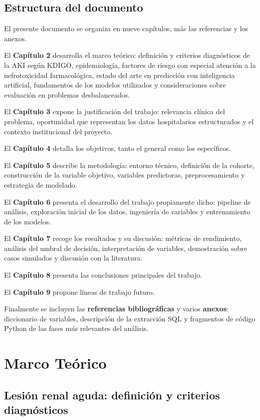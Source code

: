 \documentclass[12pt, a4paper, oneside]{report}
\begin{document}
\section{Estructura del documento}

El presente documento se organiza en nueve capítulos, más las referencias y los anexos.

El \textbf{Capítulo 2} desarrolla el marco teórico: definición y criterios diagnósticos de la AKI según KDIGO, epidemiología, factores de riesgo con especial atención a la nefrotoxicidad farmacológica, estado del arte en predicción con inteligencia artificial, fundamentos de los modelos utilizados y consideraciones sobre evaluación en problemas desbalanceados.

El \textbf{Capítulo 3} expone la justificación del trabajo: relevancia clínica del problema, oportunidad que representan los datos hospitalarios estructurados y el contexto institucional del proyecto.

El \textbf{Capítulo 4} detalla los objetivos, tanto el general como los específicos.

El \textbf{Capítulo 5} describe la metodología: entorno técnico, definición de la cohorte, construcción de la variable objetivo, variables predictoras, preprocesamiento y estrategia de modelado.

El \textbf{Capítulo 6} presenta el desarrollo del trabajo propiamente dicho: pipeline de análisis, exploración inicial de los datos, ingeniería de variables y entrenamiento de los modelos.

El \textbf{Capítulo 7} recoge los resultados y su discusión: métricas de rendimiento, análisis del umbral de decisión, interpretación de variables, demostración sobre casos simulados y discusión con la literatura.

El \textbf{Capítulo 8} presenta las conclusiones principales del trabajo.

El \textbf{Capítulo 9} propone líneas de trabajo futuro.

Finalmente se incluyen las \textbf{referencias bibliográficas} y varios \textbf{anexos}: diccionario de variables, descripción de la extracción SQL y fragmentos de código Python de las fases más relevantes del análisis.

\chapter{Marco Teórico}
\section{Lesión renal aguda: definición y criterios diagnósticos}
\end{document}
